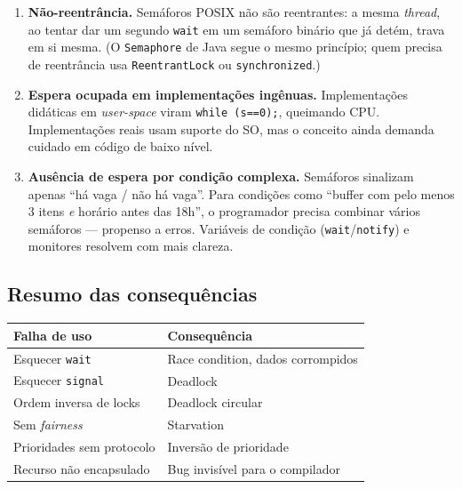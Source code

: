 \begin{enumerate}[leftmargin=*, itemsep=4pt]
\item \textbf{Não-reentrância.}
Semáforos POSIX não são reentrantes: a mesma \textit{thread}, ao tentar
dar um segundo \texttt{wait} em um semáforo binário que já detém, trava
em si mesma. (O \texttt{Semaphore} de Java segue o mesmo princípio;
quem precisa de reentrância usa \texttt{ReentrantLock} ou
\texttt{synchronized}.)

\item \textbf{Espera ocupada em implementações ingênuas.}
Implementações didáticas em \textit{user-space} viram \texttt{while
(s==0);}, queimando CPU. Implementações reais usam suporte do SO, mas
o conceito ainda demanda cuidado em código de baixo nível.

\item \textbf{Ausência de espera por condição complexa.}
Semáforos sinalizam apenas ``há vaga / não há vaga''. Para condições
como ``buffer com pelo menos 3 itens \textit{e} horário antes das 18h'',
o programador precisa combinar vários semáforos --- propenso a erros.
Variáveis de condição (\texttt{wait}/\texttt{notify}) e monitores
resolvem com mais clareza.

\end{enumerate}

\subsection{Resumo das consequências}

\begin{center}
\small
\begin{tabular}{ll}
\toprule
\textbf{Falha de uso}                  & \textbf{Consequência}                  \\
\midrule
Esquecer \texttt{wait}                 & Race condition, dados corrompidos      \\
Esquecer \texttt{signal}               & Deadlock                               \\
Ordem inversa de locks                 & Deadlock circular                      \\
Sem \textit{fairness}                  & Starvation                             \\
Prioridades sem protocolo              & Inversão de prioridade                 \\
Recurso não encapsulado                & Bug invisível para o compilador        \\
\bottomrule
\end{tabular}
\end{center}

